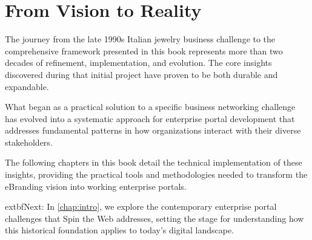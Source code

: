 \section{From Vision to Reality}

The journey from the late 1990s Italian jewelry business challenge to the comprehensive framework presented in this book represents more than two decades of refinement, implementation, and evolution. The core insights discovered during that initial project have proven to be both durable and expandable.

What began as a practical solution to a specific business networking challenge has evolved into a systematic approach for enterprise portal development that addresses fundamental patterns in how organizations interact with their diverse stakeholders.

The following chapters in this book detail the technical implementation of these insights, providing the practical tools and methodologies needed to transform the eBranding vision into working enterprise portals.

	extbf{Next}: In \cref{chap:intro}, we explore the contemporary enterprise portal challenges that Spin the Web addresses, setting the stage for understanding how this historical foundation applies to today's digital landscape.
